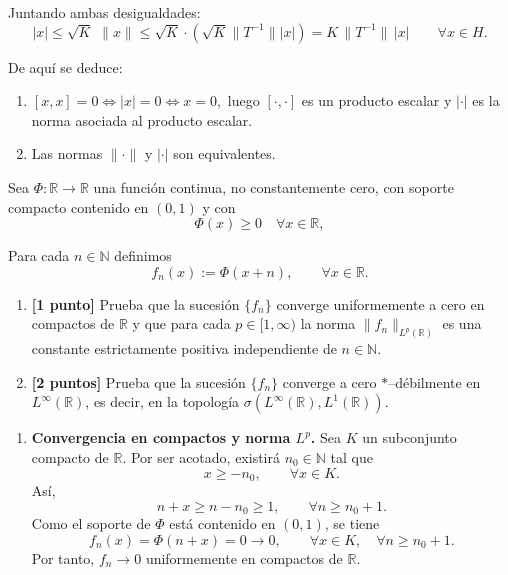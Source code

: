 \documentclass[12pt]{article}
\newcommand{\norma}[1]{\lVert #1 \rVert}
\begin{document}
\begin{ejercicio}[5 puntos]
    Juntando ambas desigualdades:
    \[
    |x|
    \le \sqrt{K}\,\,\norma{x}
    \le \sqrt{K} \cdot (\sqrt{K} \|T^{-1}\| |x|) = K\,\|T^{-1}\|\,|x|
    \qquad \forall x\in H.
    \]
    
    De aquí se deduce:
   
    \begin{enumerate}
    \item $[x,x]=0 \Longleftrightarrow |x|=0 \Longleftrightarrow x=0,$ luego $[\cdot,\cdot]$ es un producto escalar y $|\cdot|$ es la norma asociada al producto escalar.
    \item Las normas $\|\cdot\|$ y $|\cdot|$ son equivalentes.
    \end{enumerate}
    \end{ejercicio}
    
    \begin{ejercicio}[4 puntos ]
    Sea $\Phi : \mathbb{R}\to\mathbb{R}$ una función continua, no constantemente cero, con soporte compacto contenido en $(0,1)$  y con
    \[
    \Phi(x)\ge 0 \quad \forall x\in\mathbb{R},
    \]
    
    Para cada $n\in\mathbb{N}$ definimos
    \[
    f_n(x) := \Phi(x+n), \qquad \forall x\in\mathbb{R}.
    \]
    
    \begin{enumerate}
    \item \textbf{[1 punto]}  
    Prueba que la sucesión $\{f_n\}$ converge uniformemente a cero en compactos de $\mathbb{R}$
    y que para cada $p\in[1,\infty)$ la norma $\|f_n\|_{L^p(\mathbb{R})}$ es una constante
    estrictamente positiva independiente de $n\in\mathbb{N}$.
    
    \item \textbf{[2 puntos]}  
    Prueba que la sucesión $\{f_n\}$ converge a cero $\ast$--débilmente en $L^\infty(\mathbb{R})$,
    es decir, en la topología $\sigma(L^\infty(\mathbb{R}),L^1(\mathbb{R}))$.
    \end{enumerate}


    \begin{enumerate}
    \item \textbf{Convergencia en compactos y norma $L^p$.}
        Sea $K$ un subconjunto compacto de $\mathbb{R}$. Por ser acotado, existirá $n_0\in\mathbb{N}$ tal que
    \[
    x \ge -n_0, \qquad \forall x\in K.
    \]
    Así,
    \[
    n+x \ge n-n_0 \ge 1, \qquad \forall n\ge n_0+1.
    \]
    Como el soporte de $\Phi$ está contenido en $(0,1)$, se tiene
    \[
    f_n(x)=\Phi(n+x)=0 \longrightarrow 0,
    \qquad \forall x\in K, \quad \forall n\ge n_0+1.
    \]
    Por tanto, $f_n\to 0$ uniformemente en compactos de $\mathbb{R}$.
    

\end{enumerate}
\end{ejercicio}
\end{document}
